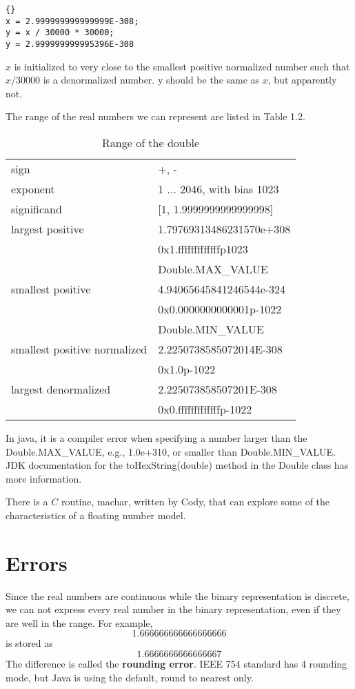 \begin{lstlisting}[frame=trbl]{}
x = 2.999999999999999E-308;
y = x / 30000 * 30000;
y = 2.999999999995396E-308
\end{lstlisting}
$x$ is initialized to very close to the smallest positive normalized number such that $x / 30000$ is a denormalized number. y should be the same as $x$, but apparently not.

The range of the real numbers we can represent are listed in Table 1.2.
\begin{table}
\caption{Range of the double}
\centering
\begin{tabular}{l l} 
\hline\hline
sign & +, - \\
exponent & 1 ... 2046, with bias 1023 \\
significand & [1, 1.9999999999999998] \\
largest positive & 1.79769313486231570e+308 \\
 & 0x1.fffffffffffffp1023 \\
 & Double.MAX\_VALUE \\
smallest positive & 4.94065645841246544e-324 \\
 & 0x0.0000000000001p-1022 \\
 & Double.MIN\_VALUE \\
smallest positive normalized & 2.2250738585072014E-308 \\
 & 0x1.0p-1022 \\
largest denormalized & 2.225073858507201E-308 \\
 & 0x0.fffffffffffffp-1022 \\
\end{tabular}
\end{table}
In java, it is a compiler error when specifying a number larger than the Double.MAX\_VALUE, e.g., 1.0e+310, or smaller than Double.MIN\_VALUE. JDK documentation for the toHexString(double) method in the Double class has more information. 

There is a $C$ routine, machar, written by Cody, that can explore some of the characteristics of a floating number model.

\section{Errors}
Since the real numbers are continuous while the binary representation is discrete, we can not express every real number in the binary representation, even if they are well in the range. For example, \[1.666666666666666666\] is stored as \[1.6666666666666667\] The difference is called the \textbf{rounding error}. IEEE 754 standard has 4 rounding mode, but Java is using the default, round to nearest only.

